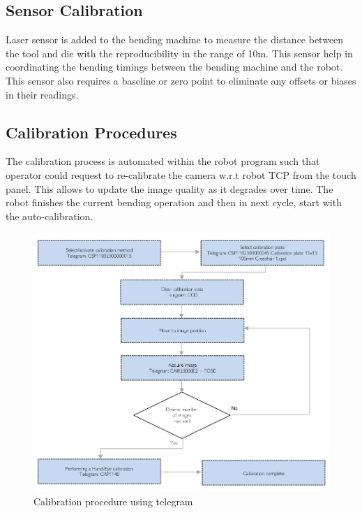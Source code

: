 \subsection{Sensor Calibration}
Laser sensor is added to the bending machine to measure the distance between the tool and die with the reproducibility in the range of 10\textmu m. This sensor help in coordinating the bending timings between the bending machine and the robot. This sensor also requires a baseline or zero point to eliminate any offsets or biases in their readings.

\subsection{Calibration Procedures}

The calibration process is automated within the robot program
such that operator could request to re-calibrate the camera w.r.t
robot TCP from the touch panel. This allows to update the image quality as it degrades over time. 
The robot finishes the current
bending operation and then in next cycle, start with the auto-calibration.

\begin{figure}[h]
    \centering
    \includegraphics[width=\textwidth]{6. System Integration and Testing/6.2 Calibration Procedures/graph.png}
    \caption{Calibration procedure using telegram}
    \label{fig:calib-graph}
\end{figure}

